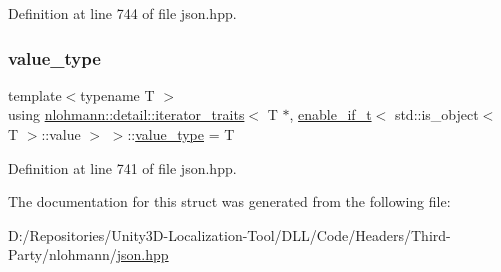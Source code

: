 Definition at line 744 of file json.\+hpp.

\mbox{\label{structnlohmann_1_1detail_1_1iterator__traits_3_01_t_01_5_00_01enable__if__t_3_01std_1_1is__objec8d960665487688165530972cda4f1bea_a443e6a62f5fb2c545fc71c751b98ca8d}} 
\subsubsection{\texorpdfstring{value\_type}{value\_type}}
{\footnotesize\ttfamily template$<$typename T $>$ \\
using \mbox{\hyperlink{structnlohmann_1_1detail_1_1iterator__traits}{nlohmann\+::detail\+::iterator\+\_\+traits}}$<$ T $\ast$, \mbox{\hyperlink{namespacenlohmann_1_1detail_a02bcbc878bee413f25b985ada771aa9c}{enable\+\_\+if\+\_\+t}}$<$ std\+::is\+\_\+object$<$ T $>$\+::value $>$ $>$\+::\mbox{\hyperlink{structnlohmann_1_1detail_1_1iterator__traits_3_01_t_01_5_00_01enable__if__t_3_01std_1_1is__objec8d960665487688165530972cda4f1bea_a443e6a62f5fb2c545fc71c751b98ca8d}{value\+\_\+type}} =  T}



Definition at line 741 of file json.\+hpp.



The documentation for this struct was generated from the following file\+:\begin{DoxyCompactItemize}
\item 
D\+:/\+Repositories/\+Unity3\+D-\/\+Localization-\/\+Tool/\+D\+L\+L/\+Code/\+Headers/\+Third-\/\+Party/nlohmann/\mbox{\hyperlink{json_8hpp}{json.\+hpp}}\end{DoxyCompactItemize}
